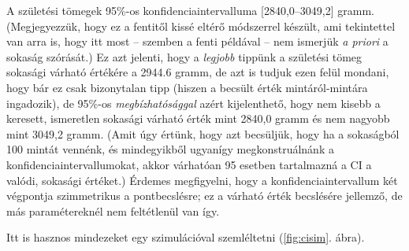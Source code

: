 \documentclass[
]{book}
\newenvironment{Shaded}{\begin{snugshade}}{\end{snugshade}}
\newcommand{\AttributeTok}[1]{\textcolor[rgb]{0.77,0.63,0.00}{#1}}
\newcommand{\ConstantTok}[1]{\textcolor[rgb]{0.00,0.00,0.00}{#1}}
\newcommand{\DecValTok}[1]{\textcolor[rgb]{0.00,0.00,0.81}{#1}}
\newcommand{\FloatTok}[1]{\textcolor[rgb]{0.00,0.00,0.81}{#1}}
\newcommand{\FunctionTok}[1]{\textcolor[rgb]{0.00,0.00,0.00}{#1}}
\newcommand{\NormalTok}[1]{#1}
\newcommand{\OtherTok}[1]{\textcolor[rgb]{0.56,0.35,0.01}{#1}}
\newcommand{\SpecialCharTok}[1]{\textcolor[rgb]{0.00,0.00,0.00}{#1}}
\newcommand{\StringTok}[1]{\textcolor[rgb]{0.31,0.60,0.02}{#1}}
\begin{document}
A születési tömegek 95\%-os konfidenciaintervalluma {[}2840,0--3049,2{]} gramm. (Megjegyezzük, hogy ez a fentitől kissé eltérő módszerrel készült, ami tekintettel van arra is, hogy itt most -- szemben a fenti példával -- nem ismerjük \emph{a priori} a sokaság szórását.) Ez azt jelenti, hogy a \emph{legjobb} tippünk a születési tömeg sokasági várható értékére a 2944.6 gramm, de azt is tudjuk ezen felül mondani, hogy bár ez csak bizonytalan tipp (hiszen a becsült érték mintáról-mintára ingadozik), de 95\%-os \emph{megbízhatósággal} azért kijelenthető, hogy nem kisebb a keresett, ismeretlen sokasági várható érték mint 2840,0 gramm és nem nagyobb mint 3049,2 gramm. (Amit úgy értünk, hogy azt becsüljük, hogy ha a sokaságból 100 mintát vennénk, és mindegyikből ugyanígy megkonstruálnánk a konfidenciaintervallumokat, akkor várhatóan 95 esetben tartalmazná a CI a valódi, sokasági értéket.) Érdemes megfigyelni, hogy a konfidenciaintervallum két végpontja szimmetrikus a pontbecslésre; ez a várható érték becslésére jellemző, de más paramétereknél nem feltétlenül van így.

Itt is hasznos mindezeket egy szimulációval szemléltetni (\ref{fig:cisim}. ábra).

\begin{Shaded}
\end{Shaded}
\end{document}
